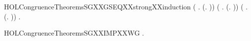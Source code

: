 \begin{SaveVerbatim}{HOLCongruenceTheoremsSGXXGSEQXXstrongXXinduction}
       (\HOLSymConst{\HOLTokenForall{}}  .
              \HOLSymConst{\HOLTokenConj{}}   \HOLSymConst{\HOLTokenConj{}}   \HOLSymConst{\HOLTokenConj{}}   \HOLSymConst{\HOLTokenImp{}}
             (\HOLTokenLambda{}. \HOLConst{\ensuremath{\tau}}  \HOLSymConst{+}   )) \HOLSymConst{\HOLTokenConj{}}
       (\HOLSymConst{\HOLTokenForall{}}  .
              \HOLSymConst{\HOLTokenConj{}}   \HOLSymConst{\HOLTokenConj{}}   \HOLSymConst{\HOLTokenConj{}}   \HOLSymConst{\HOLTokenImp{}}
             (\HOLTokenLambda{}.    \HOLSymConst{+} \HOLConst{\ensuremath{\tau}} )) \HOLSymConst{\HOLTokenConj{}}
       (\HOLSymConst{\HOLTokenForall{}}   .
              \HOLSymConst{\HOLTokenConj{}}   \HOLSymConst{\HOLTokenImp{}}
             (\HOLTokenLambda{}.    \HOLSymConst{+}   )) \HOLSymConst{\HOLTokenImp{}}
       \HOLSymConst{\HOLTokenForall{}}.   \HOLSymConst{\HOLTokenConj{}}   \HOLSymConst{\HOLTokenImp{}}  
\end{SaveVerbatim}
\newcommand{\HOLCongruenceTheoremsSGXXGSEQXXstrongXXinduction}{\UseVerbatim{HOLCongruenceTheoremsSGXXGSEQXXstrongXXinduction}}
\begin{SaveVerbatim}{HOLCongruenceTheoremsSGXXIMPXXWG}
\HOLTokenTurnstile{} \HOLSymConst{\HOLTokenForall{}}.   \HOLSymConst{\HOLTokenImp{}}  
\end{SaveVerbatim}
